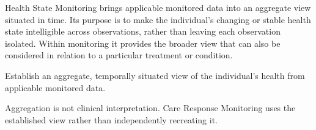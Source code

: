 Health State Monitoring brings applicable monitored data into an aggregate view situated in time. Its purpose is to make the individual's changing or stable health state intelligible across observations, rather than leaving each observation isolated. Within monitoring it provides the broader view that can also be considered in relation to a particular treatment or condition.



Establish an aggregate, temporally situated view of the individual’s health from applicable monitored data.



Aggregation is not clinical interpretation. Care Response Monitoring uses the established view rather than independently recreating it.


